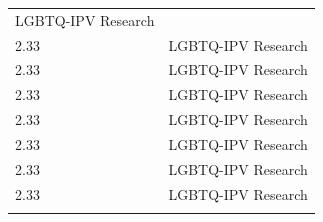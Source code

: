 \documentclass[]{tufte-handout}
\begin{document}
\begin{longtable}[]{@{}ll@{}}
\begin{minipage}[t]{0.26\columnwidth}
LGBTQ-IPV Research\strut
\end{minipage}\tabularnewline
\begin{minipage}[t]{0.09\columnwidth}\raggedright\strut
2.33\strut
\end{minipage} & \begin{minipage}[t]{0.26\columnwidth}\raggedright\strut
LGBTQ-IPV Research\strut
\end{minipage}\tabularnewline
\begin{minipage}[t]{0.09\columnwidth}\raggedright\strut
2.33\strut
\end{minipage} & \begin{minipage}[t]{0.26\columnwidth}\raggedright\strut
LGBTQ-IPV Research\strut
\end{minipage}\tabularnewline
\begin{minipage}[t]{0.09\columnwidth}\raggedright\strut
2.33\strut
\end{minipage} & \begin{minipage}[t]{0.26\columnwidth}\raggedright\strut
LGBTQ-IPV Research\strut
\end{minipage}\tabularnewline
\begin{minipage}[t]{0.09\columnwidth}\raggedright\strut
2.33\strut
\end{minipage} & \begin{minipage}[t]{0.26\columnwidth}\raggedright\strut
LGBTQ-IPV Research\strut
\end{minipage}\tabularnewline
\begin{minipage}[t]{0.09\columnwidth}\raggedright\strut
2.33\strut
\end{minipage} & \begin{minipage}[t]{0.26\columnwidth}\raggedright\strut
LGBTQ-IPV Research\strut
\end{minipage}\tabularnewline
\begin{minipage}[t]{0.09\columnwidth}\raggedright\strut
2.33\strut
\end{minipage} & \begin{minipage}[t]{0.26\columnwidth}\raggedright\strut
LGBTQ-IPV Research\strut
\end{minipage}\tabularnewline
\begin{minipage}[t]{0.09\columnwidth}\raggedright\strut
2.33\strut
\end{minipage} & \begin{minipage}[t]{0.26\columnwidth}\raggedright\strut
LGBTQ-IPV Research\strut
\end{minipage}\tabularnewline
\begin{minipage}[t]{0.09\columnwidth}\raggedright\strut

\end{minipage}
\end{longtable}
\end{document}
